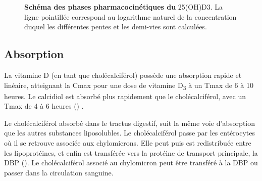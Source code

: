 \documentclass[
  a4paper,
  DIV=11,
  numbers=noendperiod,
  listof=totoc]{scrreprt}
\begin{document}
\begin{figure}


\caption[Schéma des phases pharmacocinétiques du
cholécalciférol]{\label{fig-PK-all-VitD}\textbf{Schéma des phases
pharmacocinétiques du} \ac{25(OH)D3}. La ligne pointillée correspond au
logarithme naturel de la concentration duquel les différentes pentes et
les demi-vies sont calculées. \autocite{Schoenmakers.2018}}

\end{figure}%

\subsection{Absorption}\label{absorption}

La vitamine D (en tant que cholécalciférol) possède une absorption
rapide et linéaire, atteignant la \ac{Cmax} pour une dose de vitamine
D\textsubscript{3} à un \ac{Tmax} de 6 à 10 heures. Le calcidiol est
absorbé plus rapidement que le cholécalciférol, avec un \ac{Tmax} de 4 à
6 heures () \autocite{Schoenmakers.2018}.

Le cholécalciférol absorbé dans le tractus digestif, suit la même voie
d'absorption que les autres substances liposolubles. Le cholécalciférol
passe par les entérocytes où il se retrouve associée aux chylomicrons.
Elle peut puis est redistribuée entre les lipoprotéines, et enfin est
transférée vers la protéine de transport principale, la \ac{DBP}
(). Le cholécalciférol associé au chylomicron
peut être transféré à la \ac{DBP} ou passer dans la circulation
sanguine.
\end{document}
